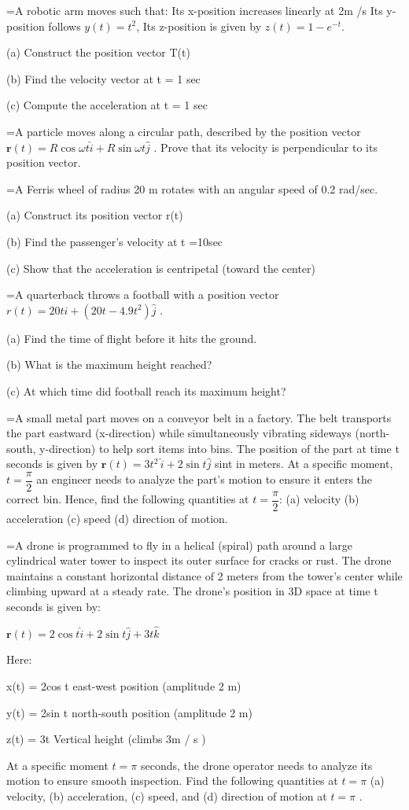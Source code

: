 \documentclass[11pt,a4paper]{article}
\newlength{\qw}\settowidth{\qw}{\textbf{888.}\ }
\newcommand{\q}[2]{%
  \Needspace{3\baselineskip}%
  \par\medskip\noindent\hangindent=\qw\hangafter=1\makebox[\qw][l]{\textbf{#1.}}#2\par}
\begin{document}
\q{598}{A robotic arm moves such that: Its x-position increases linearly at 2m /s Its y-position follows $y(t)=t^{2}$, Its z-position is given by $z(t)=1-e^{-t}$.\par (a) Construct the position vector T(t)\par (b) Find the velocity vector at t = 1 sec\par (c) Compute the acceleration at t = 1 sec}
\q{599}{A particle moves along a circular path, described by the position vector $\boldsymbol{r}(t)=R\cos\omega t\hat{i}+R\sin\omega t\hat{j}$ . Prove that its velocity is perpendicular to its position vector.}
\q{600}{A Ferris wheel of radius 20 m rotates with an angular speed of 0.2 rad/sec.\par (a) Construct its position vector r(t)\par (b) Find the passenger's velocity at t =10sec\par (c) Show that the acceleration is centripetal (toward the center)}
\q{601}{A quarterback throws a football with a position vector $r(t)=20t\hat{i}+(20t-4.9t^{2})\hat{j}$ .\par (a) Find the time of flight before it hits the ground.\par (b) What is the maximum height reached?\par (c) At which time did football reach its maximum height?}
\q{602}{A small metal part moves on a conveyor belt in a factory. The belt transports the part eastward (x-direction) while simultaneously vibrating sideways (north-south, y-direction) to help sort items into bins. The position of the part at time t seconds is given by $\boldsymbol{r}(t)=3t^{2}\,\hat{i}+2\sin t\hat{j}$ sint in meters. At a specific moment, $t=\dfrac{\pi}{2}$ an engineer needs to analyze the part's motion to ensure it enters the correct bin. Hence, find the following quantities at $t=\dfrac{\pi}{2}$: (a) velocity (b) acceleration (c) speed (d) direction of motion.}
\q{603}{A drone is programmed to fly in a helical (spiral) path around a large cylindrical water tower to inspect its outer surface for cracks or rust. The drone maintains a constant horizontal distance of 2 meters from the tower's center while climbing upward at a steady rate. The drone's position in 3D space at time t seconds is given by:\par $\boldsymbol{r}(t)=2\cos t\hat{i}+2\sin t\hat{j}+3t\hat{k}$\par Here:\par x(t) = 2cos t east-west position (amplitude 2 m)\par y(t) = 2sin t north-south position (amplitude 2 m)\par z(t) = 3t Vertical height (climbs 3m / s )\par At a specific moment $t=\pi$ seconds, the drone operator needs to analyze its motion to ensure smooth inspection. Find the following quantities at $t=\pi$ (a) velocity, (b) acceleration, (c) speed, and (d) direction of motion at $t=\pi$ .}
\end{document}
